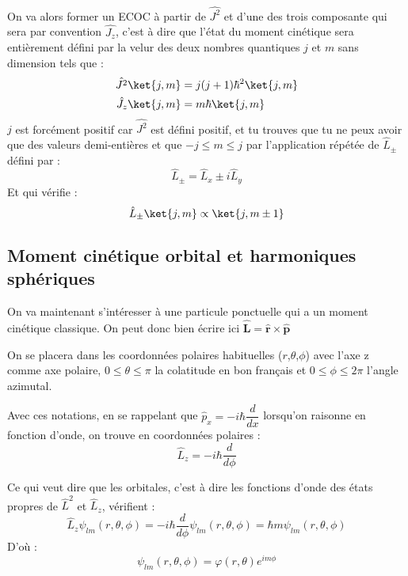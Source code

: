 \documentclass[a4paper]{report}
\begin{document}
On va alors former un ECOC à partir de $\hat{J^2}$ et d'une des trois composante qui sera par convention $\hat{J_z}$, c'est à dire que l'état du moment cinétique sera entièrement défini par la velur des deux nombres quantiques $j$ et $m$ sans dimension tels que :\begin{align}
\hat{J^2}\ket{j,m}&=j(j+1) \hbar^2 \ket{j,m} \\
\hat J_z\ket{j,m}&= m\hbar \ket{j,m}
\end{align}
$j$ est forcément positif car $\hat{J^2}$ est défini positif, et tu trouves que tu ne peux avoir que des valeurs demi-entières et que $-j \leq m \leq j$ par l'application répétée de $\hat L_\pm$ défini par :\begin{equation}
\hat L_\pm= \hat L_x \pm i \hat L_y
\end{equation}
Et qui vérifie :\begin{equation}
\hat L_\pm \ket{j,m} \propto \ket{j,m \pm 1}
\end{equation}
\subsection{Moment cinétique orbital et harmoniques sphériques}
On va maintenant s'intéresser à une particule ponctuelle qui a un moment cinétique classique. On peut donc bien écrire ici $\hat{\bm{L}}=\hat{\bm{r}} \times \hat{ \bm p}$

On se placera dans les coordonnées polaires habituelles ($r$,$\theta$,$\phi$) avec l'axe z comme axe polaire, $0 \leq \theta \leq \pi$ la colatitude en bon français et $0 \leq \phi \leq 2\pi$ l'angle azimutal.

Avec ces notations, en se rappelant que $\hat p_x = -i\hbar\dfrac{d}{dx}$ lorsqu'on raisonne en fonction d'onde, on trouve en coordonnées polaires : \begin{equation}
\hat L_z= -i\hbar \dfrac{d}{d\phi}
\end{equation}

Ce qui veut dire que les orbitales, c'est à dire les fonctions d'onde des états propres de $\hat L^2$ et $\hat L_z$, vérifient : \begin{equation}
\hat L_z \psi_{lm}(r,\theta, \phi)= -i\hbar \dfrac{d}{d\phi} \psi_{lm}(r,\theta, \phi) = \hbar m \psi_{lm}(r,\theta, \phi)
\end{equation}
D'où : \begin{equation}
\psi_{lm}(r,\theta, \phi)= \varphi(r,\theta)e^{i m \phi}
\end{equation}
\end{document}
